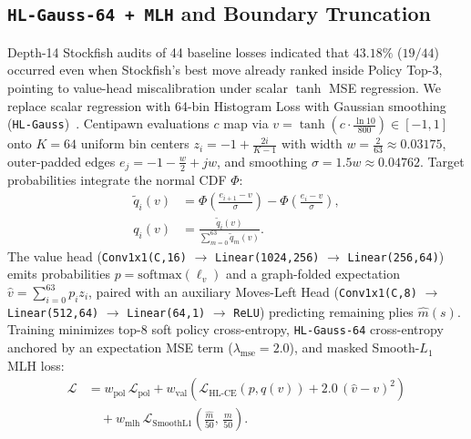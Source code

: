 \documentclass[10pt,twocolumn]{article}
\begin{document}
\subsection{\texttt{HL-Gauss-64 + MLH} and Boundary Truncation}
Depth-14 Stockfish audits of 44 baseline losses indicated that $43.18\%$ ($19/44$) occurred even when Stockfish's best move already ranked inside Policy Top-3, pointing to value-head miscalibration under scalar $\tanh$ MSE regression. We replace scalar regression with 64-bin Histogram Loss with Gaussian smoothing (\texttt{HL-Gauss})~\cite{imani2018hlgauss,farebrother2024stop}. Centipawn evaluations $c$ map via $v = \tanh(c \cdot \frac{\ln 10}{800}) \in [-1, 1]$ onto $K = 64$ uniform bin centers $z_i = -1 + \frac{2i}{K-1}$ with width $w = \frac{2}{63} \approx 0.03175$, outer-padded edges $e_j = -1 - \frac{w}{2} + jw$, and smoothing $\sigma = 1.5w \approx 0.04762$. Target probabilities integrate the normal CDF $\Phi$:
\begin{align}
  \tilde{q}_i(v) &= \Phi\!\left(\frac{e_{i+1} - v}{\sigma}\right) - \Phi\!\left(\frac{e_i - v}{\sigma}\right), \nonumber\\
  q_i(v) &= \frac{\tilde{q}_i(v)}{\sum_{m=0}^{63} \tilde{q}_m(v)}.
  \label{eq:hlgauss}
\end{align}
The value head (\texttt{Conv1x1(C,16)} $\to$ \texttt{Linear(1024,256)} $\to$ \texttt{Linear(256,64)}) emits probabilities $p = \mathrm{softmax}(\ell_v)$ and a graph-folded expectation $\hat{v} = \sum_{i=0}^{63} p_i z_i$, paired with an auxiliary Moves-Left Head (\texttt{Conv1x1(C,8)} $\to$ \texttt{Linear(512,64)} $\to$ \texttt{Linear(64,1)} $\to$ \texttt{ReLU}) predicting remaining plies $\hat{m}(s)$. Training minimizes top-8 soft policy cross-entropy, \texttt{HL-Gauss-64} cross-entropy anchored by an expectation MSE term ($\lambda_{\mathrm{mse}} = 2.0$), and masked Smooth-$L_1$ MLH loss:
\begin{align}
  \mathcal{L} &= w_{\mathrm{pol}}\,\mathcal{L}_{\mathrm{pol}}
  + w_{\mathrm{val}}\!\left(\mathcal{L}_{\mathrm{HL\text{-}CE}}(p, q(v)) + 2.0\,(\hat{v} - v)^2\right) \nonumber\\
  &\quad + w_{\mathrm{mlh}}\,\mathcal{L}_{\mathrm{SmoothL1}}\!\left(\frac{\hat{m}}{50},\,\frac{m}{50}\right).
  \label{eq:loss}
\end{align}
\end{document}
